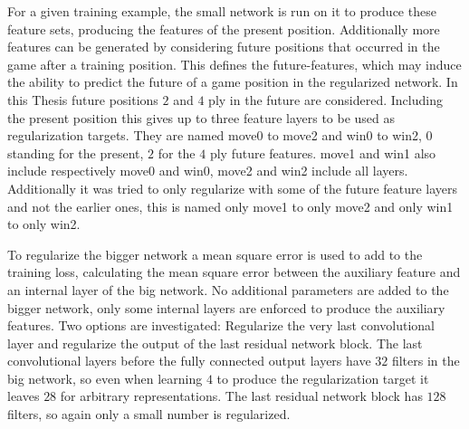 \documentclass[12pt,onecolumn,oneside,titlepage]{article}
\begin{document}
For a given training example, the small network is run on it to produce these feature sets, producing the features of the present position. Additionally more features can be generated by considering future positions that occurred in the game
after a training position. This defines the future-features, which may induce the ability to predict the future of a game position in the regularized network. In this Thesis future positions $2$ and $4$  ply in the future are considered.
Including the present position this gives up to three feature layers to be used as regularization targets. They are named move0 to move2 and win0 to win2, $0$ standing for the present, $2$ for the $4$ ply future features. move1 and win1 also include respectively move0 and win0,
move2 and win2 include all layers. Additionally it was tried to only regularize with some of the future feature layers and not the earlier ones, this is named only move1 to only move2 and only win1 to only win2.

To regularize the bigger network a mean square error is used to add to the training loss, calculating the mean square error between the auxiliary feature and an internal layer of the big network. No additional parameters are added to the bigger network,
only some internal layers are enforced to produce the auxiliary features. Two options are investigated: Regularize the very last convolutional layer and regularize the output of the last residual network block. The last convolutional layers before
the fully connected output layers have $32$ filters in the big network, so even when learning $4$ to produce the regularization target it leaves $28$ for arbitrary representations. The last residual network block has $128$ filters, so again only a small number is regularized.
\end{document}
